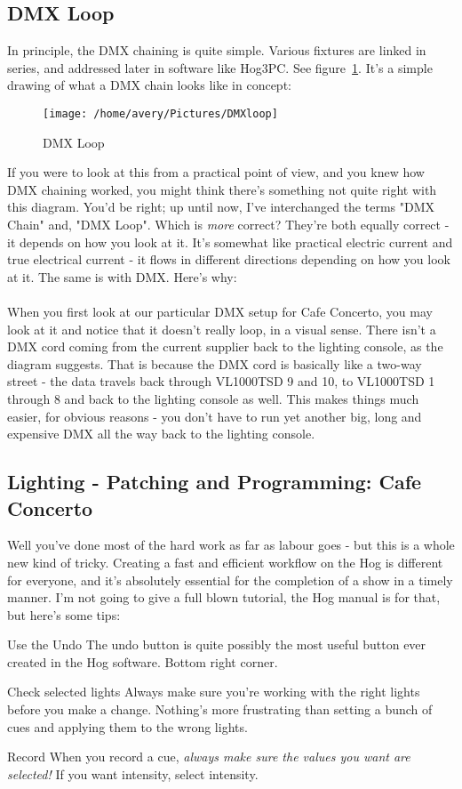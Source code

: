 \documentclass[11pt,a4paper]{book}
\begin{document}
\subsection{DMX Loop}
In principle, the DMX chaining is quite simple. Various fixtures are linked in series, and addressed later in software like Hog3PC. See figure~\ref{DMXloop}. It's a simple drawing of what a DMX chain looks like in concept:
\begin{figure}[h]
\label{DMXloop}
\texttt{[image: /home/avery/Pictures/DMXloop]} 
\caption{DMX Loop}
\end{figure}
If you were to look at this from a practical point of view, and you knew how DMX chaining worked, you might think there's something not quite right with this diagram. You'd be right; up until now, I've interchanged the terms "DMX Chain" and, "DMX Loop". Which is \textit{more} correct? They're both equally correct - it depends on how you look at it. It's somewhat like practical electric current and true electrical current - it flows in different directions depending on how you look at it. The same is with DMX. Here's why:
\\
\\
When you first look at our particular DMX setup for Cafe Concerto, you may look at it and notice that it doesn't really loop, in a visual sense. There isn't a DMX cord coming from the current supplier back to the lighting console, as the diagram suggests. That is because the DMX cord is basically like a two-way street - the data travels back through VL1000TSD 9 and 10, to VL1000TSD 1 through 8 and back to the lighting console as well. This makes things much easier, for obvious reasons - you don't have to run yet another big, long and expensive DMX all the way back to the lighting console.  

\subsection{Lighting - Patching and Programming: Cafe Concerto}
Well you've done most of the hard work as far as labour goes - but this is a whole new kind of tricky. Creating a fast and efficient workflow on the Hog is different for everyone, and it's absolutely essential for the completion of a show in a timely manner. I'm not going to give a full blown tutorial, the Hog manual is for that, but here's some tips:
\\
\begin{compactdesc}
\item[Use the Undo] The undo button is quite possibly the most useful button ever created in the Hog software. Bottom right corner.
\item[Check selected lights] Always make sure you're working with the right lights before you make a change. Nothing's more frustrating than setting a bunch of cues and applying them to the wrong lights.
\item[Record] When you record a cue, \textit{always make sure the values you want are selected!} If you want intensity, select intensity.\\
\end{compactdesc}
\end{document}

